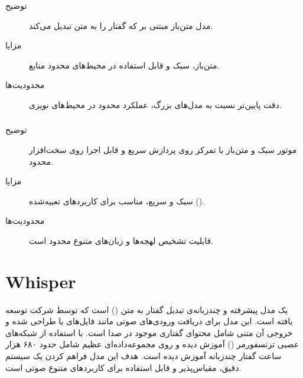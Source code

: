 \documentclass{article}
\begin{document}
\subsubsection{}
\begin{description}
\item[توضیح] مدل متن‌باز مبتنی بر  که گفتار را به متن تبدیل می‌کند.

\item[مزایا] متن‌باز، سبک و قابل استفاده در محیط‌های محدود منابع.

\item[محدودیت‌ها] دقت پایین‌تر نسبت به مدل‌های  بزرگ، عملکرد محدود در محیط‌های نویزی.

\end{description}

\subsubsection{}
\begin{description}
\item[توضیح] موتور  سبک و متن‌باز با تمرکز روی پردازش سریع و قابل اجرا روی سخت‌افزار محدود.

\item[مزایا] سبک و سریع، مناسب برای کاربردهای تعبیه‌شده ().
\item[محدودیت‌ها] قابلیت تشخیص لهجه‌ها و زبان‌های متنوع محدود است.

\end{description}




\section{Whisper}
 یک مدل پیشرفته و چندزبانه‌ی تبدیل گفتار به متن () است که توسط شرکت  توسعه یافته است.
این مدل برای دریافت ورودی‌های صوتی مانند فایل‌های  یا  طراحی شده و خروجی آن متنی شامل محتوای گفتاری موجود در صدا است.
 با استفاده از شبکه‌های عصبی ترنسفورمر () آموزش دیده و روی مجموعه‌داده‌ای عظیم شامل حدود ۶۸۰ هزار ساعت گفتار چندزبانه آموزش دیده است.
هدف این مدل فراهم کردن یک سیستم دقیق، مقیاس‌پذیر و قابل استفاده برای کاربردهای متنوع صوتی است.
\end{document}
